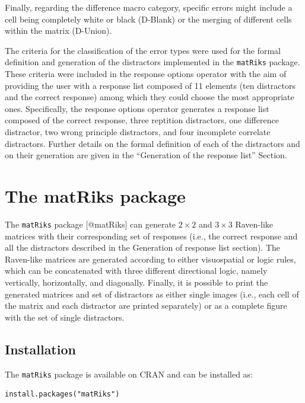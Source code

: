Finally, regarding the difference macro category, specific errors might include a cell being completely white or black (D-Blank) or the merging of different cells within the matrix (D-Union).

The criteria for the classification of the error types were used for the formal definition and generation of the distractors implemented in the \texttt{matRiks} package.
These criteria were included in the response options operator with the aim of providing the user with a response list composed of 11 elements (ten distractors and the correct response) among which they could choose the most appropriate ones.
Specifically, the response options operator generates a response list composed of the correct response, three reptition distractors, one difference distractor, two wrong principle distractors, and four incomplete correlate distractors.
Further details on the formal definition of each of the distractors and on their generation are given in the ``Generation of the response list'' Section.

\section{The matRiks package}\label{the-matriks-package}

The \texttt{matRiks} package {[}@matRiks{]} can generate \(2 \times 2\) and \(3 \times 3\) Raven-like matrices with their corresponding set of responses (i.e., the correct response and all the distractors described in the Generation of response list section).
The Raven-like matrices are generated according to either visuospatial or logic rules, which can be concatenated with three different directional logic, namely vertically, horizontally, and diagonally.
Finally, it is possible to print the generated matrices and set of distractors as either single images (i.e., each cell of the matrix and each distractor are printed separately) or as a complete figure with the set of single distractors.

\subsection{Installation}\label{installation}

The \texttt{matRiks} package is available on CRAN and can be installed as:

\begin{verbatim}
install.packages("matRiks")
\end{verbatim}

